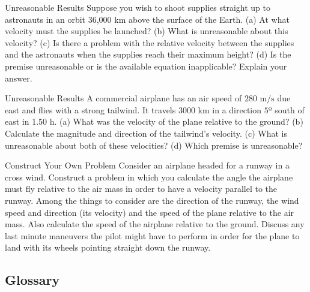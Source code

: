 \documentclass[
]{book}
\newenvironment{problems-exercises}{}{}
\newenvironment{tinysection}{}{}
\begin{document}
\begin{problems-exercises}
\hypertarget{fs-id1839158}{}
\hypertarget{fs-id1839159}{}
\begin{tinysection}

{Unreasonable Results} Suppose you wish to shoot
supplies straight up to astronauts in an orbit 36,000 km above the
surface of the Earth. (a) At what velocity must the supplies be
launched? (b) What is unreasonable about this velocity? (c) Is there a
problem with the relative velocity between the supplies and the
astronauts when the supplies reach their maximum height? (d) Is the
premise unreasonable or is the available equation inapplicable? Explain
your answer.

\end{tinysection}

\hypertarget{fs-id1915156}{}
\hypertarget{fs-id1915157}{}
\begin{tinysection}

{Unreasonable Results} A commercial airplane has an
air speed of \(\text{280~m/s}{}\) due east and flies with a strong
tailwind. It travels 3000 km in a direction \(5º{}\) south of east in 1.50
h. (a) What was the velocity of the plane relative to the ground? (b)
Calculate the magnitude and direction of the tailwind's velocity. (c)
What is unreasonable about both of these velocities? (d) Which premise
is unreasonable?

\end{tinysection}

\hypertarget{fs-id1913487}{}
\hypertarget{fs-id1802325}{}
\begin{tinysection}

{Construct Your Own Problem} Consider an airplane
headed for a runway in a cross wind. Construct a problem in which you
calculate the angle the airplane must fly relative to the air mass in
order to have a velocity parallel to the runway. Among the things to
consider are the direction of the runway, the wind speed and direction
(its velocity) and the speed of the plane relative to the air mass. Also
calculate the speed of the airplane relative to the ground. Discuss any
last minute maneuvers the pilot might have to perform in order for the
plane to land with its wheels pointing straight down the runway.

\end{tinysection}

\end{problems-exercises}

\hypertarget{glossary-10}{%
\subsection{Glossary}\label{glossary-10}}
\end{document}
